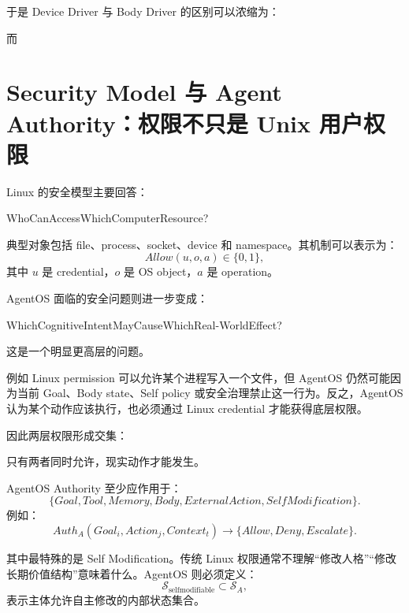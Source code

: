 于是 Device Driver 与 Body Driver 的区别可以浓缩为：
\begin{statementbox}
\centering
{}
\end{statementbox}
而
\begin{statementbox}
\centering
{}
\end{statementbox}

\section{Security Model 与 Agent Authority：权限不只是 Unix 用户权限}

Linux 的安全模型主要回答：
\begin{statementbox}
WhoCanAccessWhichComputerResource?
\end{statementbox}
典型对象包括 file、process、socket、device 和 namespace。其机制可以表示为：
\[
Allow(u,o,a)
\in
\{0,1\},
\]
其中 $u$ 是 credential，$o$ 是 OS object，$a$ 是 operation。

AgentOS 面临的安全问题则进一步变成：
\begin{statementbox}
WhichCognitiveIntentMayCauseWhichReal-WorldEffect?
\end{statementbox}
这是一个明显更高层的问题。

例如 Linux permission 可以允许某个进程写入一个文件，但 AgentOS 仍然可能因为当前 Goal、Body state、Self policy 或安全治理禁止这一行为。反之，AgentOS 认为某个动作应该执行，也必须通过 Linux credential 才能获得底层权限。

因此两层权限形成交集：
\begin{statementbox}
\centering
{}
\end{statementbox}
只有两者同时允许，现实动作才能发生。

AgentOS Authority 至少应作用于：
\[
\{
Goal,
Tool,
Memory,
Body,
ExternalAction,
SelfModification
\}.
\]
例如：
\[
Auth_A(
Goal_i,
Action_j,
Context_t
)
\rightarrow
\{Allow,Deny,Escalate\}.
\]

其中最特殊的是 Self Modification。传统 Linux 权限通常不理解“修改人格”“修改长期价值结构”意味着什么。AgentOS 则必须定义：
\[
\mathcal S_{\mathrm{selfmodifiable}}
\subset
\mathcal S_A,
\]
表示主体允许自主修改的内部状态集合。

